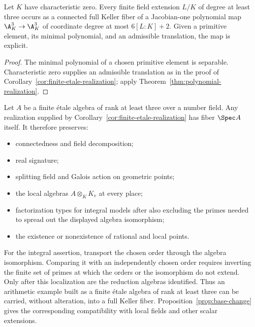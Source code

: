 \begin{corollary}\label{cor:fields}
Let \(K\) have characteristic zero.  Every finite field extension \(L/K\)
of degree at least three
occurs as a connected full Keller fiber of a Jacobian-one polynomial map
\(\A^3_K\to\A^3_K\) of coordinate degree at most \(6[L:K]+2\).
Given a primitive element, its minimal polynomial, and an admissible
translation, the map is explicit.
\end{corollary}

\begin{proof}
The minimal polynomial of a chosen primitive element is separable.
Characteristic zero supplies an admissible translation as in the proof of
Corollary~\ref{cor:finite-etale-realization}; apply
Theorem~\ref{thm:polynomial-realization}.
\end{proof}

\begin{corollary}\label{cor:transfer}
Let \(A\) be a finite \'etale algebra of rank at least three over a number
field.  Any realization supplied by
Corollary~\ref{cor:finite-etale-realization} has fiber \(\Spec A\) itself.
It therefore preserves:
\begin{itemize}
\item connectedness and field decomposition;
\item real signature;
\item splitting field and Galois action on geometric points;
\item the local algebras \(A\otimes_KK_v\) at every place;
\item factorization types for integral models after also excluding the
primes needed to spread out the displayed algebra isomorphism;
\item the existence or nonexistence of rational and local points.
\end{itemize}
For the integral assertion, transport the chosen order through the algebra
isomorphism. Comparing it with an independently chosen order requires
inverting the finite set of primes at which the orders or the isomorphism
do not extend. Only after this localization are the reduction algebras
identified.
Thus an arithmetic example built as a finite \'etale algebra of rank at least
three can be carried, without alteration, into a full Keller fiber.
Proposition~\ref{prop:base-change} gives the corresponding compatibility with
local fields and other scalar extensions.
\end{corollary}
